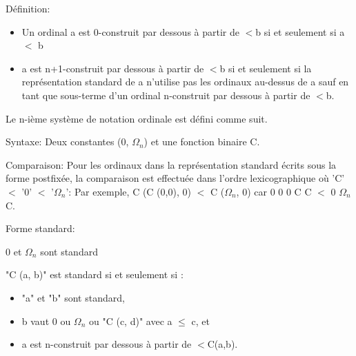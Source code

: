\documentclass[12pt]{beamer}
\begin{document}
\begin{frame}

\footnotesize

Définition: 

\begin{itemize}
\item Un ordinal a est 0-construit par dessous à partir de $<$b si et seulement si a $<$ b
\item a est n+1-construit par dessous à partir de $<$b  si et seulement si la représentation standard de a n'utilise pas les ordinaux au-dessus de a sauf en tant que sous-terme d'un ordinal n-construit par dessous à partir de $<$b.
\end{itemize}

Le n-ième  système de notation ordinale est défini comme suit.

Syntaxe: Deux constantes (0, $\Omega_n$) et une fonction binaire C.

Comparaison: Pour les ordinaux dans la représentation standard écrits sous la forme postfixée, la comparaison est effectuée dans l’ordre lexicographique où 'C' $<$ '0' $<$ '$\Omega_n$': Par exemple, C (C (0,0), 0) $<$ C ($\Omega_n$, 0) car 0 0 0 C C $<$ 0 $\Omega_n$ C.

Forme standard:

0 et $\Omega_n$ sont standard

"C (a, b)" est standard si et seulement si :

\begin{itemize}
\item "a" et "b" sont standard,
\item b vaut 0 ou $\Omega_n$ ou "C (c, d)" avec a $\le$ c, et
\item a est n-construit par dessous à partir de $<$C(a,b).
\end{itemize}

\end{frame}
\end{document}
